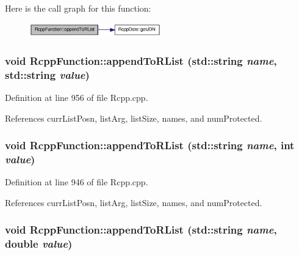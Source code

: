 Here is the call graph for this function:\nopagebreak
\begin{figure}[H]
\begin{center}
\leavevmode
\includegraphics[width=162pt]{classRcppFunction_a9aab0b3accb81d90fb813acf3bf4c49d_cgraph}
\end{center}
\end{figure}
\hypertarget{classRcppFunction_a861ba7ae5c09acf31a034472b5a47728}{
\subsubsection[{appendToRList}]{\setlength{\rightskip}{0pt plus 5cm}void RcppFunction::appendToRList (std::string {\em name}, \/  std::string {\em value})}}
\label{classRcppFunction_a861ba7ae5c09acf31a034472b5a47728}


Definition at line 956 of file Rcpp.cpp.

References currListPosn, listArg, listSize, names, and numProtected.\hypertarget{classRcppFunction_afce449ac5d89b32e0e0b9f584278a672}{
\subsubsection[{appendToRList}]{\setlength{\rightskip}{0pt plus 5cm}void RcppFunction::appendToRList (std::string {\em name}, \/  int {\em value})}}
\label{classRcppFunction_afce449ac5d89b32e0e0b9f584278a672}


Definition at line 946 of file Rcpp.cpp.

References currListPosn, listArg, listSize, names, and numProtected.\hypertarget{classRcppFunction_a0df1a8ff093e21a2a7c6fc80d6645c7e}{
\subsubsection[{appendToRList}]{\setlength{\rightskip}{0pt plus 5cm}void RcppFunction::appendToRList (std::string {\em name}, \/  double {\em value})}}
\label{classRcppFunction_a0df1a8ff093e21a2a7c6fc80d6645c7e}


